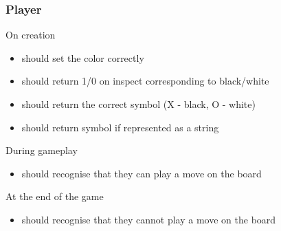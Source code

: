 \documentclass[a4wide, 11pt]{article}
\begin{document}
  \subsubsection{Player}
  \begin{itemize}
    \begin{item}
      \vspace{-2mm}
      On creation
      \vspace{-3mm}
      \begin{itemize}
        \setlength{\itemsep}{-1mm}
        \item{should set the color correctly}
        \item{should return 1/0 on inspect corresponding to black/white}
        \item{should return the correct symbol (X - black, O - white)}
        \item{should return symbol if represented as a string}
      \end{itemize}
    \end{item}
    \begin{item}
      \vspace{-2mm}
      During gameplay
      \vspace{-3mm}
      \begin{itemize}
        \setlength{\itemsep}{-1mm}
        \item{should recognise that they can play a move on the board}
      \end{itemize}
    \end{item}
    \begin{item}
      \vspace{-2mm}
      At the end of the game
      \vspace{-3mm}
      \begin{itemize}
        \setlength{\itemsep}{-1mm}
        \item{should recognise that they cannot play a move on the board}
      \end{itemize}
    \end{item}
  \end{itemize}
\end{document}

